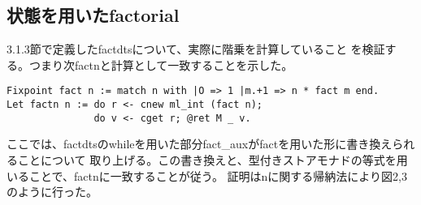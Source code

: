 \documentclass[japanese]{jssst_ppl}
\theoremstyle{definition}
\begin{document}
\iffalse
  \begin{verbatim}
    mc91 n m
   |《 definition of mc91 》|

   | \scalebox{0.8}{$\approx$} | while (fun nm : nat * nat =>
    let (n0, m0) := nm in if n0 == 0 then Ret (inl m0)
                                     else if 100 < m0
                                          then Ret (inr (n0.-1, m0 - 10))
                                          else Ret (inr (n0.+1, m0 + 11))) (n.+1, m)
   |《 fixpointE 》|
   | \scalebox{0.8}{$\approx$} | (if 100 < m then Ret (inr (n, m - 10))
                else Ret (inr (n.+2, m + 11))) >>= sum_rect (fun=> M nat) Ret (while mc91_body)
   |《 $m < 101$ 》|
    |\scalebox{0.8}{$\approx$}| Ret (inr (n.+2, m + 11)) >>= sum_rect (fun=> M nat) Ret (while mc91_body)
   |《 Monad law: Ret a >>= f = f a 》|
    |\scalebox{0.8}{$\approx$}| while mc91_body (n.+2, m + 1)
   |《 definition of mc91,fixpointE 》|
    |\scalebox{0.8}{$\approx$}| (if 100 < m + 11
        then Ret (inr (n.+1, m + 11 - 10))
        else Ret (inr (n.+3, m + 11 + 11))) >>= sum_rect (fun=> M nat) Ret (while mc91_body)
   |《 $90 \leq m \implies 100 < m + 11$, Monad law  》|
    |\scalebox{0.8}{$\approx$}|  while mc91_body (n.+1, m + 11 - 10) = mc91 n (m+1)

      \end{verbatim}

\fi

\subsection{状態を用いたfactorial}
3.1.3節で定義したfactdtsについて、実際に階乗を計算していること
を検証する。つまり次factnと計算として一致することを示した。

\begin{verbatim}
Fixpoint fact n := match n with |O => 1 |m.+1 => n * fact m end.
Let factn n := do r <- cnew ml_int (fact n);
               do v <- cget r; @ret M _ v.
\end{verbatim}

ここでは、factdtsのwhileを用いた部分fact\_auxがfactを用いた形に書き換えられることについて
取り上げる。この書き換えと、型付きストアモナドの等式を用いることで、factnに一致することが従う。
証明はnに関する帰納法により図2,3のように行った。
\end{document}

